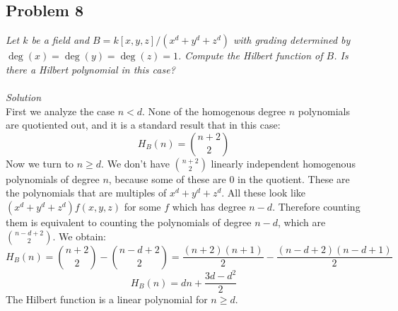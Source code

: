\documentclass[12 pt]{article}
\begin{document}
\subsection*{Problem 8}
\emph{Let $k$ be a field and $B = k[x, y, z]/(x^d + y^d + z^d)$ with grading determined by $\deg(x) = \deg(y) = \deg(z) = 1$. Compute the Hilbert function of $B$. Is there a Hilbert polynomial in this case?}
\\
\\
\emph{Solution}
\\
First we analyze the case $n<d$. None of the homogenous degree $n$ polynomials are quotiented out, and it is a standard result that in this case:
\[      H_B(n) = \binom{n+2}{2}     \]
Now we turn to $n\geq d$. We don't have $\binom{n+2}{2}$ linearly independent homogenous polynomials of degree $n$, because some of these are $0$ in the quotient. These are the polynomials that are multiples of $x^d + y^d + z^d$. All these look like $(x^d + y^d + z^d) f(x,y,z)$ for some $f$ which has degree $n-d$. Therefore counting them is equivalent to counting the polynomials of degree $n-d$, which are $\binom{n-d+2}{2}$. We obtain:
\[      H_B(n) = \binom{n+2}{2} - \binom{n-d+2}{2} = \frac{(n+2)(n+1)}{2} - \frac{(n-d+2)(n-d+1)}{2}   \]
\[   H_B(n) = dn + \frac{3d-d^2}{2}   \]
The Hilbert function is a linear polynomial for $n\geq d$.
\end{document}
